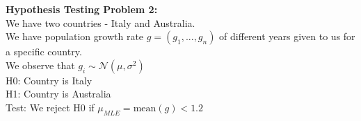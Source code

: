 \documentclass[fleqn, 11pt]{article}
\begin{document}
\vspace{15pt}

\textbf{Hypothesis Testing Problem 2:} \\
We have two countries - Italy and Australia. \\
We have population growth rate $g = (g_1, ..., g_n)$ of different years given to us for a specific country. \\
We observe that $g_i \sim \mathcal{N}(\mu, \sigma^2)$ \\
H0: Country is Italy \\
H1: Country is Australia \\
Test: We reject H0 if $\mu_{MLE} = \text{mean}(g) < 1.2$ \\
\end{document}
